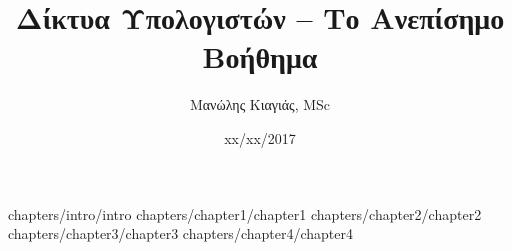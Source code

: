 \documentclass[a4paper,twoside,12pt]{book}
\author{Μανώλης Κιαγιάς, MSc}
\title{Δίκτυα Υπολογιστών -- Το Ανεπίσημο Βοήθημα}
\date{xx/xx/2017}
\begin{document}
\frontmatter
 {chapters/intro/intro}
\mainmatter
 {chapters/chapter1/chapter1}
 {chapters/chapter2/chapter2}
 {chapters/chapter3/chapter3}
 {chapters/chapter4/chapter4}
\end{document}
